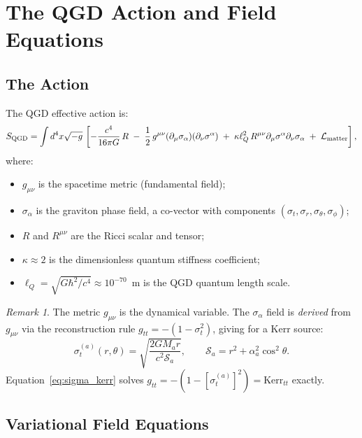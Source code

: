 \documentclass[11pt,a4paper]{article}
\theoremstyle{definition}
\theoremstyle{remark}
\newtheorem{remark}{Remark}[section]
\newcommand{\sig}[2]{\sigma_{#1}^{(#2)}}
\newcommand{\lQ}{\ell_{Q}}
\begin{document}
	\section{The QGD Action and Field Equations}
	\label{sec:action}
	
	\subsection{The Action}
	
	The QGD effective action is:
	\begin{equation}
		S_{\rm QGD}
		= \int d^4x\sqrt{-g}\,\left[
		-\frac{c^4}{16\pi G}\,R
		\;-\;\frac{1}{2}\,g^{\mu\nu}(\partial_\mu\sigma_\alpha)(\partial_\nu\sigma^\alpha)
		\;+\;\kappa\lQ^2\,R^{\mu\nu}\partial_\mu\sigma^\alpha\partial_\nu\sigma_\alpha
		\;+\;\mathcal{L}_{\rm matter}
		\right],
		\label{eq:action}
	\end{equation}
	where:
	\begin{itemize}
		\item $g_{\mu\nu}$ is the spacetime metric (fundamental field);
		\item $\sigma_\alpha$ is the graviton phase field, a co-vector with
		components $(\sigma_t,\sigma_r,\sigma_\theta,\sigma_\phi)$;
		\item $R$ and $R^{\mu\nu}$ are the Ricci scalar and tensor;
		\item $\kappa\approx2$ is the dimensionless quantum stiffness
		coefficient;
		\item $\lQ=\sqrt{G\hbar^2/c^4}\approx10^{-70}$~m is the QGD quantum
		length scale.
	\end{itemize}
	
	\begin{remark}
		The metric $g_{\mu\nu}$ is the dynamical variable.  The $\sigma_\alpha$
		field is \emph{derived} from $g_{\mu\nu}$ via the reconstruction rule
		$g_{tt}=-(1-\sigma_t^2)$, giving for a Kerr source:
		\begin{equation}
			\sig{t}{a}(r,\theta)
			= \sqrt{\frac{2GM_a r}{c^2\mathcal{S}_a}},
			\qquad \mathcal{S}_a = r^2+\alpha_a^2\cos^2\theta.
			\label{eq:sigma_kerr}
		\end{equation}
		Equation~\eqref{eq:sigma_kerr} solves $g_{tt}=-(1-[\sig{t}{a}]^2)=\text{Kerr}_{tt}$ exactly.
	\end{remark}
	
	\subsection{Variational Field Equations}
	
\end{document}

